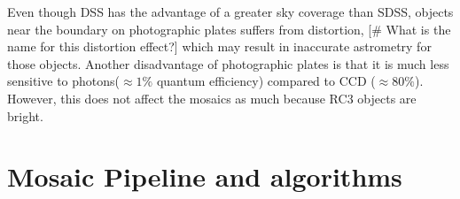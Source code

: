 \documentclass[5p]{elsarticle}
\begin{document}
Even though DSS has the advantage of a  greater sky coverage than SDSS, objects near the boundary on photographic plates suffers from distortion, [\# What is the name for this distortion effect?] which may result in inaccurate astrometry for those objects.	Another disadvantage of photographic plates is that it is much less sensitive to photons($\approx 1\%$ quantum efficiency) compared to  CCD  ($\approx 80\%$). However, this does not affect the mosaics as much because RC3 objects are bright. 
	
\section{Mosaic Pipeline and algorithms}
\end{document}
